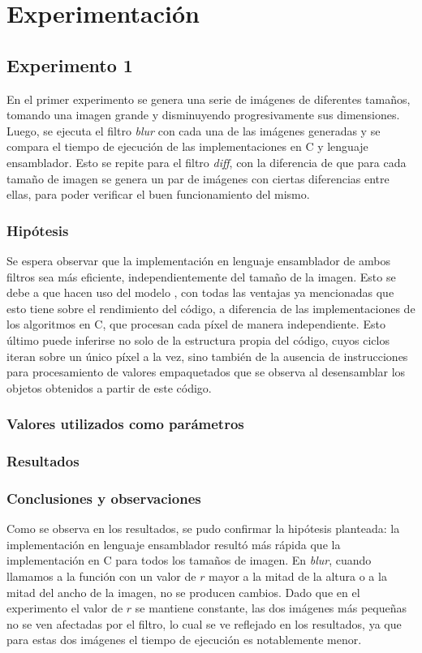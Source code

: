 \section{Experimentación}

	\subsection{Experimento 1}
		En el primer experimento se genera una serie de imágenes de diferentes tamaños, tomando una imagen grande y disminuyendo progresivamente sus dimensiones.
		Luego, se ejecuta el filtro \emph{blur} con cada una de las imágenes generadas y se compara el tiempo de ejecución de las implementaciones en C y lenguaje ensamblador.
		Esto se repite para el filtro \emph{diff}, con la diferencia de que para cada tamaño de imagen se genera 
		un par de imágenes con ciertas diferencias entre ellas, para poder verificar el buen funcionamiento del mismo.

		\subsubsection*{Hipótesis} 
			Se espera observar que la implementación en lenguaje ensamblador de ambos filtros sea más eficiente, independientemente del tamaño de la imagen. Esto se debe a que hacen uso del modelo , con todas las ventajas ya mencionadas que esto tiene sobre el rendimiento del código, a diferencia de las implementaciones de los algoritmos en C, que procesan cada píxel de manera independiente. Esto último puede inferirse no solo de la estructura propia del código, cuyos ciclos iteran sobre un único píxel a la vez, sino también de la ausencia de instrucciones  para procesamiento de valores empaquetados que se observa al desensamblar los objetos obtenidos a partir de este código.

		\subsubsection*{Valores utilizados como parámetros} 

		\subsubsection*{Resultados}

		\subsubsection*{Conclusiones y observaciones} 
			Como se observa en los resultados, se pudo confirmar la hipótesis planteada: la implementación en lenguaje ensamblador resultó más rápida que la implementación en C para todos los tamaños de imagen.
			En \emph{blur}, cuando llamamos a la función con un valor de $r$ mayor a la mitad de la altura o a la mitad del ancho de la imagen, no se producen cambios. Dado que en el experimento el valor de $r$ se mantiene constante, las dos imágenes más pequeñas no se ven afectadas por el filtro, lo cual se ve reflejado en los resultados, ya que para estas dos imágenes el tiempo de ejecución es notablemente menor.

